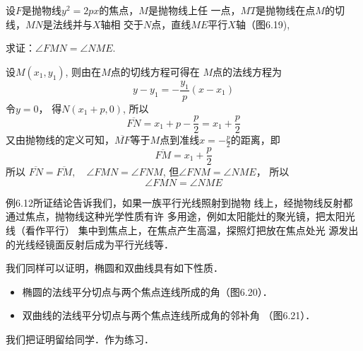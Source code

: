 \begin{example}
    设$F$是抛物线$y^2=2px$的焦点，$M$是抛物线上任
    一点，$MT$是抛物线在点$M$的切线，$MN$是法线并与$X$轴相
    交于$N$点，直线$ME$平行$X$轴（图6.19),
    
    求证：$\angle FMN=\angle NME$.
\end{example}

\begin{solution}
设$M(x_1,y_1)$, 则由在$M$点的切线方程可得在
$M$点的法线方程为
\[y-y_1=-\frac{y_1}{p}(x-x_1)\]
令$y=0$，
得$N(x_1+p,0)$, 
所以
\[\overline{FN}=x_1+p-\frac{p}{2}= x_1+\frac{p}{2}\]
又由抛物线的定义可知，$\overline{MF}$等于$M$点到准线$x=-\frac{p}{2}$的距离，即
\[\overline{FM}=x_1+\frac{p}{2}\]
所以
$\overline{FN}=\overline{FM},\quad \angle FMN=\angle FNM$, 
但$\angle FNM=\angle NME$，
所以
\[\angle FMN=\angle NME\]
\end{solution}

例6.12所证结论告诉我们，如果一族平行光线照射到抛物
线上，经抛物线反射都通过焦点，抛物线这种光学性质有许
多用途，例如太阳能灶的聚光镜，把太阳光线（看作平行）
集中到焦点上，在焦点产生高温，探照灯把放在焦点处光
源发出的光线经镜面反射后成为平行光线等．

我们同样可以证明，椭圆和双曲线具有如下性质．
\begin{itemize}
    \item 椭圆的法线平分切点与两个焦点连线所成的角（图6.20）．
    \item 双曲线的法线平分切点与两个焦点连线所成角的邻补角
（图6.21）．
\end{itemize}

我们把证明留给同学．作为练习．
    
